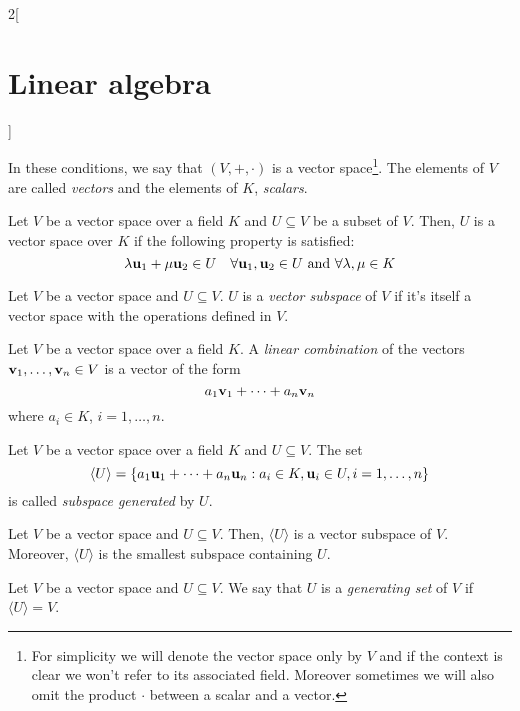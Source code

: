 \documentclass[../../../main.tex]{subfiles}
\begin{document}
\begin{multicols}{2}[\section{Linear algebra}]
\begin{definition}
\begin{enumerate}
    \end{enumerate}
    In these conditions, we say that $(V,+,\cdot)$ is a vector space\footnote{For simplicity we will denote the vector space only by $V$ and if the context is clear we won't refer to its associated field. Moreover sometimes we will also omit the product $\cdot$ between a scalar and a vector.}. The elements of $V$ are called \emph{vectors} and the elements of $K$, \emph{scalars}.
  \end{definition}
  \begin{definition}
    Let $V$ be a vector space over a field $K$ and $U\subseteq V$ be a subset of $V$. Then, $U$ is a vector space over $K$ if the following property is satisfied:
    $$\lambda \boldsymbol{\mathrm{u}}_1+\mu \boldsymbol{\mathrm{u}}_2\in U\quad\forall \boldsymbol{\mathrm{u}}_1,\boldsymbol{\mathrm{u}}_2\in U\text{ and }\forall\lambda,\mu\in K$$
  \end{definition}
  \begin{definition}
    Let $V$ be a vector space and $U\subseteq V$. $U$ is a \emph{vector subspace} of $V$ if it's itself a vector space with the operations defined in $V$.
  \end{definition}
  \begin{definition}
    Let $V$ be a vector space over a field $K$. A \emph{linear combination} of the vectors $\boldsymbol{\mathrm{v}}_1,\ldots,\boldsymbol{\mathrm{v}}_n\in V$ is a vector of the form $$a_1\boldsymbol{\mathrm{v}}_1+\cdots+a_n\boldsymbol{\mathrm{v}}_n$$ where $a_i\in K$, $i=1,\ldots,n$.
  \end{definition}
  \begin{definition}
    Let $V$ be a vector space over a field $K$ and $U\subseteq V$. The set $$\langle U\rangle=\{a_1\boldsymbol{\mathrm{u}}_1+\cdots+a_n\boldsymbol{\mathrm{u}}_n:a_i\in K,\boldsymbol{\mathrm{u}}_i\in U,i=1,\ldots,n\}$$ is called \emph{subspace generated} by $U$.
  \end{definition}
  \begin{lemma}
    Let $V$ be a vector space and $U\subseteq V$. Then, $\langle U\rangle$ is a vector subspace of $V$. Moreover, $\langle U\rangle$ is the smallest subspace containing $U$.
  \end{lemma}
  \begin{definition}
    Let $V$ be a vector space and $U\subseteq V$. We say that $U$ is a \emph{generating set} of $V$ if $\langle U\rangle=V$.
  \end{definition}

\end{multicols}
\end{document}
